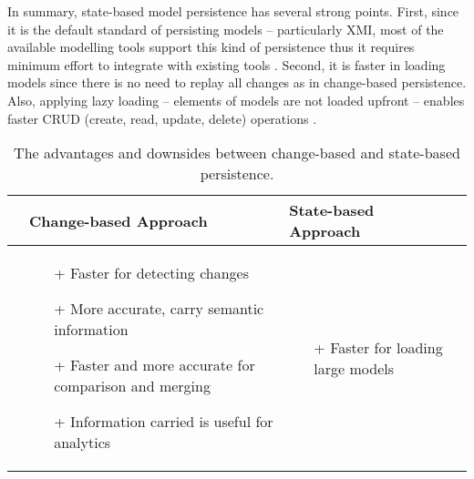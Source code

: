 In summary, state-based model persistence has several strong points. First, since it is the default standard of persisting models -- particularly XMI, most of the available modelling tools support this kind of persistence thus it requires minimum effort to integrate with existing tools \cite{koegel2010emfstore}. Second, it is faster in loading models since there is no need to replay all changes as in change-based persistence. Also, applying lazy loading -- elements of models are not loaded upfront -- enables faster CRUD (create, read, update, delete) operations \cite{DBLP:conf/models/Espinazo-PaganCM11,daniel2016neoemf}. 

\begin{table*}[h]
  \centering
  \caption{The advantages and downsides between change-based and state-based persistence.}
  \label{table:advantages_drawbacks}
  \begin{scriptsize}
    \begin{tabular}
      {|>{\centering\arraybackslash}p{1.1cm}|>{\centering\arraybackslash}p{1.1cm}|>{\centering\arraybackslash}p{5cm}|>{\centering\arraybackslash}p{5cm}|}
      \hline 
      \multicolumn{2}{|c|}{\textbf{Dimensions}}&\textbf{Change-based Approach}&\textbf{State-based Approach}\\
      \hline 
      \multicolumn{2}{|p{2.2cm}|}{\centering Advantages} &
      \begin{minipage}[t]{5cm}
        \begin{itemize}[leftmargin=9pt]
          \setlength\itemsep{2pt}
          \item[+] Faster for detecting changes \cite{DBLP:conf/edoc/KoegelHLHD10}
          \item[+] More accurate, carry semantic information \cite{DBLP:journals/entcs/RobbesL07,DBLP:conf/sde/LippeO92,DBLP:conf/caise/IgnatN05,mens2002state}  
          \item[+] Faster and more accurate for comparison and merging \cite{DBLP:conf/sde/LippeO92,DBLP:conf/caise/IgnatN05,koegel2010emfstore}
          \item[+] Information carried is useful for analytics \cite{DBLP:journals/entcs/RobbesL07}
        \end{itemize}
      \end{minipage}
      & 
      \begin{minipage}[t]{5cm}
        \raggedright
        \begin{itemize}[leftmargin=9pt]
          \setlength\itemsep{2pt}
          \item[+] Faster for loading large models \cite{DBLP:conf/models/Espinazo-PaganCM11,daniel2016neoemf,eclipse2019cdo}

\end{itemize}
\end{minipage}
\end{tabular}
\end{scriptsize}
\end{table*}
